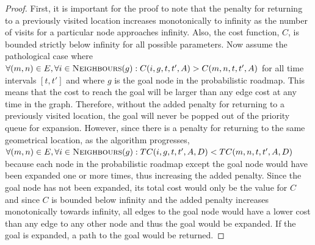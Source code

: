 \begin{proof}

    First, it is important for the proof to note that the penalty for returning
    to a previously visited location increases monotonically to infinity as the
    number of visits for a particular node approaches infinity. Also, the cost
    function, $C$, is bounded strictly below infinity for all possible
    parameters. Now assume the pathological case where $\forall (m, n)
    \in E, \forall i \in \Function{Neighbours}(g) : C(i, g, t, t', A) > C(m, n,
    t, t', A)$ for all time intervals $[t, t']$ and where $g$ is the goal node
    in the probabilistic roadmap. This means that the cost to reach the goal
    will be larger than any edge cost at any time in the graph.  Therefore,
    without the added penalty for returning to a previously visited location,
    the goal will never be popped out of the priority queue for expansion.
    However, since there is a penalty for returning to the same geometrical
    location, as the algorithm progresses, $\forall (m, n)
    \in E, \forall i \in \Function{Neighbours}(g) : TC(i, g, t, t', A, D) <
    TC(m, n, t, t', A, D)$ because each node in the probabilistic roadmap
    except the goal node would have been expanded one or more times, thus
    increasing the added penalty. Since the goal node has not been expanded,
    its total cost would only be the value for $C$ and since $C$ is bounded
    below infinity and the added penalty increases monotonically towards
    infinity, all edges to the goal node would have a lower cost than any edge
    to any other node and thus the goal would be expanded. If the goal is
    expanded, a path to the goal would be returned.

\end{proof}


